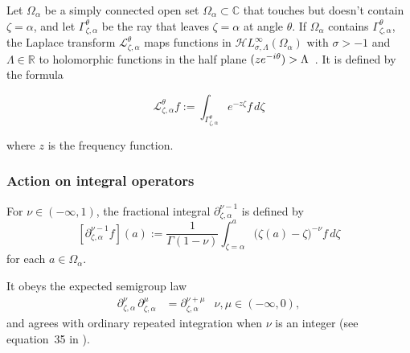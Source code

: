 \documentclass{article}
\theoremstyle{plain}
\newcommand{\R}{\mathbb{R}}
\newcommand{\C}{\mathbb{C}}
\let\Re\relax
\DeclareMathOperator{\Re}{Re}
\newcommand{\laplace}{\mathcal{L}}
\newcommand{\fracderiv}[3]{\partial^{#1}_{#2, #3}}
\newcommand{\singexp}[2]{\mathcal{H}L^\infty_{#1, #2}}
\newcommand{\domain}{\Omega}
\begin{document}

Let $\domain_\alpha$ be a simply connected open set $\domain_\alpha\subset\C$ that touches but doesn't contain $\zeta=\alpha$, and let $\Gamma_{\zeta, \alpha}^\theta$ be the ray that leaves $\zeta=\alpha$ at angle $\theta$. If $\domain_\alpha$ contains $\Gamma_{\zeta, \alpha}^\theta$, the Laplace transform $\laplace_{\zeta, \alpha}^{\theta} $ maps functions in $\singexp{\sigma}{\Lambda}(\domain_\alpha)$ with $\sigma>-1$ and $\Lambda\in\R$ to holomorphic functions in the half plane $\Re(z e^{-i\theta}) > \Lambda$~\cite[Section 5.6]{diverg-resurg-i}. It is defined by the formula

\begin{equation}\label{laplace:int} 
\laplace_{\zeta, \alpha}^{\theta} f := \int_{\Gamma_{\zeta,\alpha}^\theta} e^{-z\zeta} f\, d\zeta
\end{equation}

where $z$ is the frequency function. 



\subsubsection{Action on integral operators}\label{L-int-op}
For $\nu \in (-\infty, 1)$, the fractional integral $\partial^{\nu-1}_{\zeta, \alpha}$ is defined by
\[ [\partial^{\nu-1}_{\zeta, \alpha} f](a) := \frac{1}{\Gamma(1-\nu)} \int_{\zeta = \alpha}^a \big(\zeta(a)-\zeta\big)^{-\nu} f\,d\zeta \]
for each $a \in \domain_\alpha$.

It obeys the expected semigroup law \cite[Section  1.3]{mladenov2014advanced}
\begin{align*}
\fracderiv{\nu}{\zeta}{\alpha}\,\fracderiv{\mu}{\zeta}{\alpha} & = \fracderiv{\nu+\mu}{\zeta}{\alpha} & \nu, \mu \in (-\infty, 0),
\end{align*}
and agrees with ordinary repeated integration when $\nu$ is an integer (see equation~35 in \cite{mladenov2014advanced}).

\end{document}
